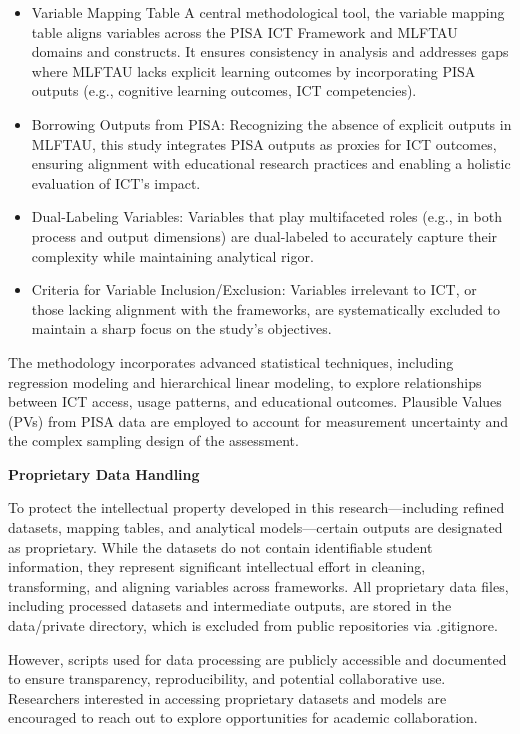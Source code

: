 \documentclass[
]{article}
\begin{document}
\begin{itemize}
\item
  Variable Mapping Table A central methodological tool, the variable
  mapping table aligns variables across the PISA ICT Framework and
  MLFTAU domains and constructs. It ensures consistency in analysis and
  addresses gaps where MLFTAU lacks explicit learning outcomes by
  incorporating PISA outputs (e.g., cognitive learning outcomes, ICT
  competencies).
\item
  Borrowing Outputs from PISA: Recognizing the absence of explicit
  outputs in MLFTAU, this study integrates PISA outputs as proxies for
  ICT outcomes, ensuring alignment with educational research practices
  and enabling a holistic evaluation of ICT's impact.
\item
  Dual-Labeling Variables: Variables that play multifaceted roles (e.g.,
  in both process and output dimensions) are dual-labeled to accurately
  capture their complexity while maintaining analytical rigor.
\item
  Criteria for Variable Inclusion/Exclusion: Variables irrelevant to
  ICT, or those lacking alignment with the frameworks, are
  systematically excluded to maintain a sharp focus on the study's
  objectives.
\end{itemize}

The methodology incorporates advanced statistical techniques, including
regression modeling and hierarchical linear modeling, to explore
relationships between ICT access, usage patterns, and educational
outcomes. Plausible Values (PVs) from PISA data are employed to account
for measurement uncertainty and the complex sampling design of the
assessment.

\textbf{Proprietary Data Handling}

To protect the intellectual property developed in this
research---including refined datasets, mapping tables, and analytical
models---certain outputs are designated as proprietary. While the
datasets do not contain identifiable student information, they represent
significant intellectual effort in cleaning, transforming, and aligning
variables across frameworks. All proprietary data files, including
processed datasets and intermediate outputs, are stored in the
data/private directory, which is excluded from public repositories via
.gitignore.

However, scripts used for data processing are publicly accessible and
documented to ensure transparency, reproducibility, and potential
collaborative use. Researchers interested in accessing proprietary
datasets and models are encouraged to reach out to explore opportunities
for academic collaboration.
\end{document}

